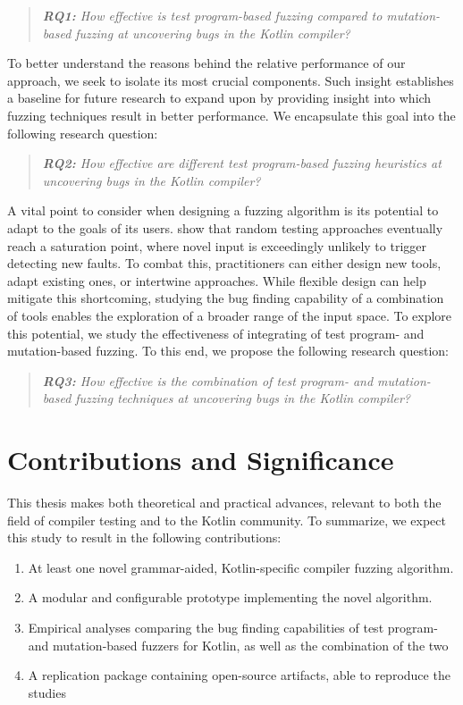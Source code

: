 \begin{quote}
\centering 
\emph{\textbf{RQ1:} How effective is test program-based
fuzzing compared to mutation-based fuzzing
at uncovering bugs in the Kotlin compiler?}
\end{quote}

To better understand the reasons behind the relative performance
of our approach, we seek to isolate its most crucial components.
Such insight establishes a baseline for future research to expand upon
by providing insight into which fuzzing techniques result in better performance.
We encapsulate this goal into the following research question:

\begin{quote}
\centering 
\emph{\textbf{RQ2:} How effective are different test program-based
fuzzing heuristics at uncovering bugs in the Kotlin compiler?}
\end{quote}

A vital point to consider when designing a fuzzing algorithm is
its potential to adapt to the goals of its users. \citet{amalfitano2015exploiting}
show that random testing approaches eventually reach a
saturation point, where novel input is exceedingly unlikely to trigger
detecting new faults. 
To combat this, practitioners can either design new tools, adapt existing
ones, or intertwine approaches.
While flexible design can help mitigate this shortcoming, studying the 
bug finding capability of a combination of tools enables
the exploration of a broader range of the input space.
To explore this potential, we study the effectiveness of 
integrating of test program- and mutation-based fuzzing.
To this end, we propose the following research question:

\begin{quote}
\centering 
\emph{\textbf{RQ3:} How effective is the combination of 
test program- and mutation-based fuzzing techniques at uncovering
bugs in the Kotlin compiler?}
\end{quote}

\section{Contributions and Significance}

This thesis makes both theoretical and practical advances,
relevant to both the field of compiler testing and to the 
Kotlin community. To summarize, we expect this
study to result in the following contributions:

\begin{enumerate}
	\item At least one novel grammar-aided, Kotlin-specific compiler fuzzing algorithm.
	\item A modular and configurable prototype implementing the novel algorithm.
	\item Empirical analyses comparing the bug finding capabilities of test program- and mutation-based fuzzers for Kotlin, as well as the combination of the two
	\item A replication package containing open-source artifacts, able to reproduce the studies
\end{enumerate}

